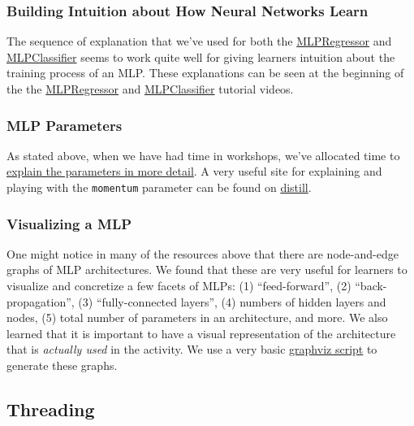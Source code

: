 \documentclass{article}
\begin{document}
\subsubsection{Building Intuition about How Neural Networks Learn}

The sequence of explanation that we've used for both the
\href{https://f003.backblazeb2.com/file/learnassets/examples/teaching-material/regressor-process.pdf}{MLPRegressor}
and
\href{https://f003.backblazeb2.com/file/learnassets/examples/teaching-material/classifier-process.pdf}{MLPClassifier}
seems to work quite well for giving learners intuition about the
training process of an MLP. These explanations can be seen at the
beginning of the the
\href{https://learn.flucoma.org/learn/regression-neural-network/}{MLPRegressor}
and
\href{https://learn.flucoma.org/learn/classification-neural-network/}{MLPClassifier}
tutorial videos.

\subsubsection{MLP Parameters}

As stated above, when we have had time in workshops, we've allocated
time to
\href{https://f003.backblazeb2.com/file/learnassets/examples/teaching-material/mlp-parameters.pdf}{explain
the parameters in more detail}. A very useful site for explaining and
playing with the \texttt{momentum} parameter can be found on
\href{https://distill.pub/2017/momentum/}{distill}.

\subsubsection{Visualizing a MLP}

One might notice in many of the resources above that there are
node-and-edge graphs of MLP architectures. We found that these are very
useful for learners to visualize and concretize a few facets of MLPs:
(1) ``feed-forward'', (2) ``back-propagation'', (3) ``fully-connected
layers'', (4) numbers of hidden layers and nodes, (5) total number of
parameters in an architecture, and more. We also learned that it is
important to have a visual representation of the architecture that is
\emph{actually used} in the activity. We use a very basic
\href{https://github.com/flucoma/graphics/tree/main/nn_visualizer}{graphviz
script} to generate these graphs.

\subsection{Threading}\label{threading}
\end{document}
